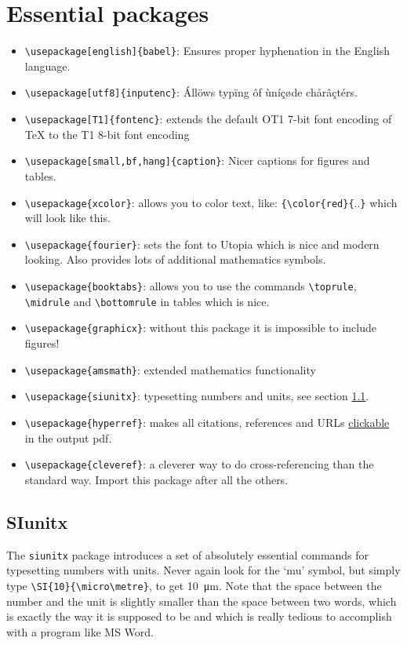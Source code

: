 \documentclass{article}
\begin{document}
\newpage
\section{Essential packages}


\begin{itemize}
\item \verb|\usepackage[english]{babel}|: Ensures proper hyphenation in the English language.
\item \verb|\usepackage[utf8]{inputenc}|: Állöws typïng ôf ùníçøde chårâçtérs.
\item \verb|\usepackage[T1]{fontenc}|: extends the default OT1 7-bit font encoding of TeX to the T1 8-bit font encoding
\item \verb|\usepackage[small,bf,hang]{caption}|: Nicer captions for figures and tables.
\item \verb|\usepackage{xcolor}|: allows you to color text, like: \verb|{\color{red}{|..\verb|}| which will look {\color{red} like this}.
\item \verb|\usepackage{fourier}|: sets the font to Utopia which is nice and modern looking. Also provides lots of additional mathematics symbols.
\item \verb|\usepackage{booktabs}|: allows you to use the commands \verb|\toprule|, \verb|\midrule| and \verb|\bottomrule| in tables which is nice.
\item \verb|\usepackage{graphicx}|: without this package it is impossible to include figures!
\item \verb|\usepackage{amsmath}|: extended mathematics functionality
\item \verb|\usepackage{siunitx}|: typesetting numbers and units, see section \ref{sec:siunitx}.
\item \verb|\usepackage{hyperref}|: makes all citations, references and URLs \hyperref[clickable]{clickable} in the output pdf. \label{clickable}
\item \verb|\usepackage{cleveref}|: a cleverer way to do cross-referencing than the standard way. Import this package after all the others.
\end{itemize}




\subsection{SIunitx}\label{sec:siunitx}

The \verb|siunitx| package introduces a set of absolutely essential commands for typesetting numbers with units. Never again look for the `mu' symbol, but simply type \verb|\SI{10}{\micro\metre}|, to get \SI{10}{\micro\metre}. Note that the space between the number and the unit is slightly smaller than the space between two words, which is exactly the way it is supposed to be and which is really tedious to accomplish with a program like MS Word.
\end{document}
